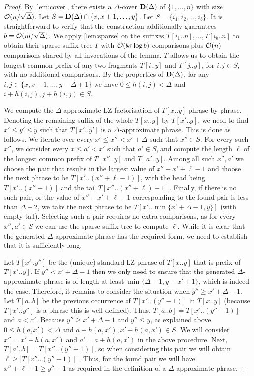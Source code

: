 \begin{proof}
By \cref{lem:cover}, there exists a $\Delta$-cover ${\bf D}(\Delta)$ of $\{1,\ldots,n\}$ with size $\mathcal{O}(n/\sqrt{\Delta})$.
Let $S={\bf D}(\Delta)\cap\{x,x+1,\ldots,y\}$. Let $S=\{i_{1},i_{2},\ldots,i_{b}\}$.
It is straightforward to verify that the construction additionally guarantees
$b = \mathcal{O}(m/\sqrt{\Delta})$. We apply \cref{lem:sparse} on the suffixes $T[i_{1}..n],\ldots,T[i_{b}..n]$ to obtain
their sparse suffix tree $T$ with $\mathcal{O}(b\sigma\log b)$ comparisons plus $\mathcal{O}(n)$ comparisons shared by all invocations of the lemma.
$T$ allows us to obtain the longest common prefix of any two fragments $T[i..y]$ and $T[j..y]$, for
$i,j\in S$, with no additional comparisons.
By the properties of ${\bf D}(\Delta)$, for any $i,j\in \{x,x+1,\ldots,y-\Delta+1\}$ we have $0\leq h(i,j)<\Delta$
and $i+h(i,j), j+h(i,j)\in S$.

We compute the $\Delta$-approximate LZ factorisation of $T[x..y]$ phrase-by-phrase. Denoting the remaining suffix
of the whole $T[x..y]$ by $T[x'..y]$, we need to find $x' \leq y'\leq y$ such that $T[x'..y']$ is a 
$\Delta$-approximate phrase. This is done as follows.
We iterate over every $x'\leq x'' < x'+\Delta$ such that $x''\in S$.
For every such $x''$, we consider every $x\leq a' < x'$ such that $a'\in S$,
and compute the length $\ell$ of the longest common prefix of $T[x''..y]$ and $T[a'..y]$.
Among all such $x'',a'$ we choose the pair that results in the largest value of $x''-x'+\ell-1$
and choose the next phrase to be $T[x'..(x''+\ell-1)]$, with the head being $T[x'..(x''-1)]$ and the tail $T[x''..(x''+\ell)-1]$.
Finally, if there is no such pair, or the value of $x''-x'+\ell-1$ corresponding to the found pair is less than $\Delta-2$,
we take the next phrase to be $T[x'..\min\{x'+\Delta-1,y\}]$ (with empty tail).
Selecting such a pair requires no extra comparisons, as for every $x'',a'\in S$ we can
use the sparse suffix tree to compute $\ell$.
While it is clear that the generated $\Delta$-approximate phrase has the required form,
we need to establish that it is sufficiently long. 

Let $T[x'..y'']$ be the (unique) standard LZ phrase of $T[x..y]$ that is prefix of $T[x'..y]$. 
If $y''<x'+\Delta-1$ then we only need to ensure that the generated $\Delta$-approximate phrase
is of length at least $\min\{\Delta-1, y-x'+1\}$, which is indeed the case.
Therefore, it remains to consider the situation when $y''\geq x'+\Delta-1$.
Let $T[a..b]$ be the previous occurrence of $T[x'..(y''-1)]$ in $T[x..y]$
(because $T[x'..y'']$ is a phrase this is well defined).
Thus, $T[a..b]=T[x'..(y''-1)]$ and $a<x'$.
Because $y'' \geq x'+\Delta-1$ and $y''\leq y$, as explained above $0\leq h(a,x')<\Delta$
and $a+h(a,x'), x'+h(a,x')\in S$.
We will consider $x''=x'+h(a,x')$ and $a'=a+h(a,x')$ in the above procedure.
Next, $T[a'..b]=T[x''..(y''-1)]$,
so when considering this pair we will obtain $\ell \geq |T[x''..(y''-1)]|$.
Thus, for the found pair we will have $x''+\ell-1 \geq y''-1$ as required
in the definition of a $\Delta$-approximate phrase.
\end{proof}

